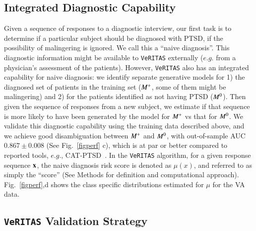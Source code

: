 \documentclass[onecolumn,10pt]{IEEEtran}
\def\Methods{Online Methods}
\def\Methods{Methods\xspace}
\def\vrts{\texttt{VeRITAS}\xspace}
\begin{document}
\subsection*{Integrated Diagnostic Capability}
Given a sequence of responses to a diagnostic interview, our first task is to determine if a particular subject should be diagnosed with PTSD,  if the  possibility of  malingering is ignored. We call this a ``naive diagnosis''. This diagnostic information might be available to \vrts externally ($e.g.$ from a physician's assessment of the patients). However, \vrts also has an integrated capability for naive diagnosis: we identify separate  generative models for 1) the diagnosed set of patients in the training set ($M^+$, some of them might be malingering) and 2) for the patients identified as not having PTSD ($M^0$). Then given the sequence of responses from a new subject, we estimate if that sequence is more likely to have been generated by the model for  $M^+$ vs that for $M^0$. We validate this diagnostic capability  using the training data described above, and we achieve good disambiguation between $M^+$ and $M^0$, with out-of-sample AUC  {\color{Red1}$0.867\pm 0.008$} (See Fig.~\ref{figperf} c), which is at par or better compared to reported tools, $e.g.$,  CAT-PTSD~\cite{Brenner_2021}. In the \vrts algorithm, for a given response sequence $\bm{\mathrm{x}}$, the naive diagnosis risk score is denoted as $\mu(x)$, and referred to as simply the ``score'' (See \Methods for definition and computational approach). Fig.~\ref{figperf},d shows the class specific distributions estimated for $\mu$ for the VA data.

\subsection*{\vrts Validation Strategy}
\end{document}
